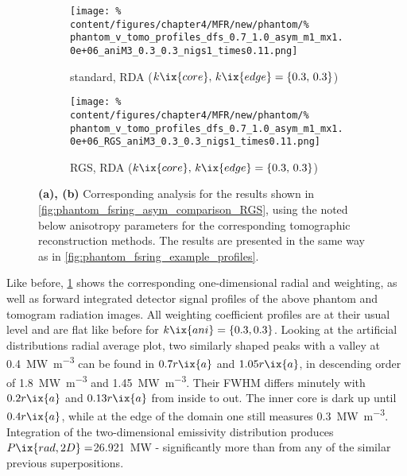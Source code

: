             \begin{figure}[t]%
                \centering%
                \begin{subfigure}{\textwidth}%
                    \centering%
                    \texttt{[image: \%
                        content/figures/chapter4/MFR/new/phantom/\%
                        phantom\_v\_tomo\_profiles\_dfs\_0.7\_1.0\_asym\_m1\_mx1.0e+06\_aniM3\_0.3\_0.3\_nigs1\_times0.11.png]}%
                    \caption{standard, RDA ($k\ix{core},\,k\ix{edge}=\left\{0.3,\,0.3\right\}$)}%
                \end{subfigure}%
                \newline%
                \begin{subfigure}{\textwidth}%
                    \centering%
                    \texttt{[image: \%
                        content/figures/chapter4/MFR/new/phantom/\%
                        phantom\_v\_tomo\_profiles\_dfs\_0.7\_1.0\_asym\_m1\_mx1.0e+06\_RGS\_aniM3\_0.3\_0.3\_nigs1\_times0.11.png]}%
                    \caption{RGS, RDA ($k\ix{core},\,k\ix{edge}=\left\{0.3,\,0.3\right\}$)}%
                \end{subfigure}%
                \caption{\textbf{(a), (b)} Corresponding analysis for the results shown in \cref{fig:phantom_fsring_asym_comparison_RGS}, using the noted below anisotropy parameters for the corresponding tomographic reconstruction methods. The results are presented in the same way as in \cref{fig:phantom_fsring_example_profiles}.}\label{fig:phantom_fsring_asym_comparison_RGS_profiles}%
            \end{figure}%
%
            Like before, \cref{fig:phantom_fsring_asym_comparison_RGS_profiles} shows the corresponding one-dimensional radial and weighting, as well as forward integrated detector signal profiles of the above phantom and tomogram radiation images. All weighting coefficient profiles are at their usual level and are flat like before for $k\ix{ani}=\left\{0.3, 0.3\right\}$. Looking at the artificial distributions radial average plot, two similarly shaped peaks with a valley at \SI{0.4}{\mega\watt\per\cubic\meter} can be found in $0.7r\ix{a}$ and $1.05r\ix{a}$, in descending order of \SI{1.8}{\mega\watt\per\cubic\meter} and \SI{1.45}{\mega\watt\per\cubic\meter}. Their FWHM differs minutely with $0.2r\ix{a}$ and $0.13r\ix{a}$ from inside to out. The inner core is dark up until $0.4r\ix{a}$, while at the edge of the domain one still measures \SI{0.3}{\mega\watt\per\cubic\meter}. Integration of the two-dimensional emissivity distribution produces $P\ix{rad,2D}=$\SI{26.921}{\mega\watt} - significantly more than from any of the similar previous superpositions.\\%
